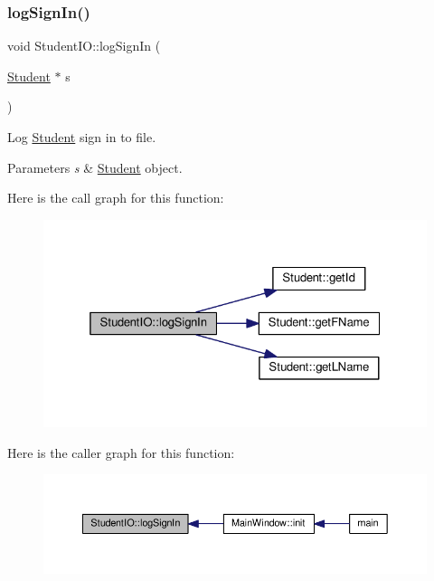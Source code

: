 \subsubsection{\texorpdfstring{log\+Sign\+In()}{logSignIn()}}
{\footnotesize\ttfamily void Student\+I\+O\+::log\+Sign\+In (\begin{DoxyParamCaption}\item[{\hyperlink{class_student}{Student} $\ast$}]{s }\end{DoxyParamCaption})}



Log \hyperlink{class_student}{Student} sign in to file. 


\begin{DoxyParams}{Parameters}
{\em s} & \hyperlink{class_student}{Student} object. \\
\hline
\end{DoxyParams}
Here is the call graph for this function\+:
\nopagebreak
\begin{figure}[H]
\begin{center}
\leavevmode
\includegraphics[width=325pt]{class_student_i_o_a1cab9c5c4ef79743bef16a6af0b3cbdb_cgraph}
\end{center}
\end{figure}
Here is the caller graph for this function\+:
\nopagebreak
\begin{figure}[H]
\begin{center}
\leavevmode
\includegraphics[width=350pt]{class_student_i_o_a1cab9c5c4ef79743bef16a6af0b3cbdb_icgraph}
\end{center}
\end{figure}
\mbox{\label{class_student_i_o_acdcab10501702f652cd46a641d8aa6ec}} 
